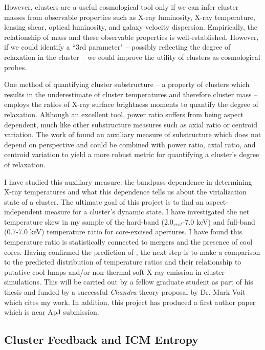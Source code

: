 \documentclass[11pt]{article}
\begin{document}
However, clusters are a useful cosmological tool only if we can infer
cluster masses from observable properties such as X-ray
luminosity, X-ray temperature, lensing shear, optical luminosity, and
galaxy velocity dispersion. Empirically, the relationship of mass and
these observable properties is well-established. However, if we could
identify a ``3rd parameter" -- possibly reflecting the degree of
relaxation in the cluster -- we could improve the utility of clusters
as cosmological probes.

One method of quantifying cluster substructure -- a property of
clusters which results in the underestimate of cluster temperatures
and therefore cluster mass -- employs the ratios of X-ray surface
brightness moments to quantify the degree of relaxation. Although an
excellent tool, power ratio suffers from being aspect dependent, much
like other substructure measures such as axial ratio or centroid
variation. The work of  \cite{2001ApJ...546..100M} found an auxiliary
measure of substructure which does not depend on perspective and could
be combined with power ratio, axial ratio, and centroid variation to
yield a more robust metric for quantifying a cluster's degree of
relaxation.

I have studied this auxiliary measure: the bandpass dependence in
determining X-ray temperatures and what this dependence tells us about
the virialization state of a cluster. The ultimate goal of this
project is to find an aspect-independent measure for a cluster's
dynamic state. I have investigated the net temperature skew in my
sample of the hard-band (2.0$_{rest}$-7.0 keV) and full-band (0.7-7.0
keV) temperature ratio for core-excised apertures. I have found this
temperature ratio is statistically connected to mergers and the
presence of cool cores. Having confirmed the prediction of
\cite{2001ApJ...546..100M}, the next step is to make a comparison to
the predicted distribution of temperature ratios and their
relationship to putative cool lumps and/or non-thermal soft X-ray
emission in cluster simulations. This will be carried out by a fellow
graduate student as part of his thesis and funded by a successful
{\textit{Chandra}} theory proposal by Dr. Mark Voit which cites my
work. In addition, this project has produced a first author paper
which is near ApJ submission.

\subsection*{Cluster Feedback and ICM Entropy}
\end{document}
